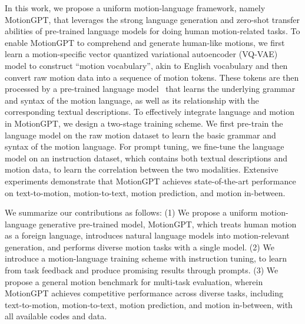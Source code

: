 In this work, we propose a uniform motion-language framework, namely MotionGPT, that leverages the strong language generation and zero-shot transfer abilities of pre-trained language models for doing human motion-related tasks. 
%
To enable MotionGPT to comprehend and generate human-like motions, we first learn a motion-specific vector quantized variational autoencoder (VQ-VAE) model to construct ``motion vocabulary'', akin to English vocabulary and then convert raw motion data into a sequence of motion tokens.
%
These tokens are then processed by a pre-trained language model~\cite{raffel2020t5,chung2022flant5} that learns the underlying grammar and syntax of the motion language, as well as its relationship with the corresponding textual descriptions.
To effectively integrate language and motion in MotionGPT, we design a two-stage training scheme.
%
We first pre-train the language model on the raw motion dataset to learn the basic grammar and syntax of the motion language.
%
For prompt tuning, we fine-tune the language model on an instruction dataset, which contains both textual descriptions and motion data, to learn the correlation between the two modalities.
%
Extensive experiments demonstrate that MotionGPT achieves state-of-the-art performance on text-to-motion, motion-to-text, motion prediction, and motion in-between.
% 



We summarize our contributions as follows: 
(1) We propose a uniform motion-language generative pre-trained model, MotionGPT, which treats human motion as a foreign language, introduces natural language models into motion-relevant generation, and performs diverse motion tasks with a single model.
(2) We introduce a motion-language training scheme with instruction tuning, to learn from task feedback and produce promising results through prompts.
%
(3) We propose a general motion benchmark for multi-task evaluation, wherein MotionGPT achieves competitive performance across diverse tasks, including text-to-motion, motion-to-text, motion prediction, and motion in-between, with all available codes and data.